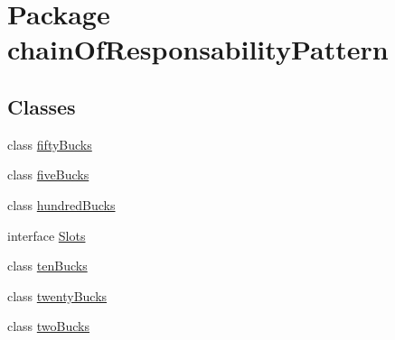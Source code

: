 \hypertarget{namespacechain_of_responsability_pattern}{}\section{Package chain\+Of\+Responsability\+Pattern}
\label{namespacechain_of_responsability_pattern}
\subsection*{Classes}
\begin{DoxyCompactItemize}
\item 
class \mbox{\hyperlink{classchain_of_responsability_pattern_1_1fifty_bucks}{fifty\+Bucks}}
\item 
class \mbox{\hyperlink{classchain_of_responsability_pattern_1_1five_bucks}{five\+Bucks}}
\item 
class \mbox{\hyperlink{classchain_of_responsability_pattern_1_1hundred_bucks}{hundred\+Bucks}}
\item 
interface \mbox{\hyperlink{interfacechain_of_responsability_pattern_1_1_slots}{Slots}}
\item 
class \mbox{\hyperlink{classchain_of_responsability_pattern_1_1ten_bucks}{ten\+Bucks}}
\item 
class \mbox{\hyperlink{classchain_of_responsability_pattern_1_1twenty_bucks}{twenty\+Bucks}}
\item 
class \mbox{\hyperlink{classchain_of_responsability_pattern_1_1two_bucks}{two\+Bucks}}
\end{DoxyCompactItemize}
